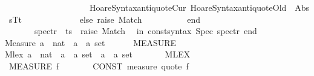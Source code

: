 \begin{isabellebody}
\ \ \ \ \ \ \ \ \ \ \ \ \ \ \ \ \ \ \ \ Hoare{\isacharunderscore}Syntax{\isachardot}antiquoteCur\ Hoare{\isacharunderscore}Syntax{\isachardot}antiquoteOld\ \ {\isacharparenleft}Abs\ {\isacharparenleft}s{\isacharcomma}T{\isacharcomma}t{\isacharparenright}{\isacharparenright}{\isacharparenright}\isanewline
\ \ \ \ \ \ \ \ \ \ \ \ \ else\ raise\ Match\isanewline
\ \ \ \ \ \ \ \ \ \ end\isanewline
\ \ \ \ \ \ {\isacharbar}\ spec{\isacharunderscore}tr{\isacharprime}\ {\isacharunderscore}\ ts\ {\isacharequal}\ raise\ Match\isanewline
\ \ in\ {\isacharbrackleft}{\isacharparenleft}{\isacharat}{\isacharbraceleft}const{\isacharunderscore}syntax\ Spec{\isacharbraceright}{\isacharcomma}\ spec{\isacharunderscore}tr{\isacharprime}{\isacharparenright}{\isacharbrackright}\ end\isanewline
{\isacartoucheclose}%
\endisatagML
{\isafoldML}%
%
\isadelimML
\isanewline
%
\endisadelimML
\isanewline
{}\isamarkupfalse%
\isanewline
{\isachardoublequoteopen}{\isacharunderscore}Measure{\isachardoublequoteclose}{\isacharcolon}{\isacharcolon}\ {\isachardoublequoteopen}{\isacharparenleft}{\isacharprime}a\ {\isasymRightarrow}\ nat{\isacharparenright}\ {\isasymRightarrow}\ {\isacharparenleft}{\isacharprime}a\ {\isasymtimes}\ {\isacharprime}a{\isacharparenright}\ set{\isachardoublequoteclose}\isanewline
\ \ \ \ \ \ {\isacharparenleft}{\isachardoublequoteopen}MEASURE\ {\isacharunderscore}{\isachardoublequoteclose}\ {\isacharbrackleft}{}{}{\isacharbrackright}\ {}{\isacharparenright}\isanewline
{\isachardoublequoteopen}{\isacharunderscore}Mlex{\isachardoublequoteclose}{\isacharcolon}{\isacharcolon}\ {\isachardoublequoteopen}{\isacharparenleft}{\isacharprime}a\ {\isasymRightarrow}\ nat{\isacharparenright}\ {\isasymRightarrow}\ {\isacharparenleft}{\isacharprime}a\ {\isasymtimes}\ {\isacharprime}a{\isacharparenright}\ set\ {\isasymRightarrow}\ {\isacharparenleft}{\isacharprime}a\ {\isasymtimes}\ {\isacharprime}a{\isacharparenright}\ set{\isachardoublequoteclose}\isanewline
\ \ \ \ \ \ {\isacharparenleft}\ {\isachardoublequoteopen}{\isacharless}{\isacharasterisk}MLEX{\isacharasterisk}{\isachargreater}{\isachardoublequoteclose}\ {}{}{\isacharparenright}\isanewline
\isanewline
\isanewline
{}\isamarkupfalse%
\isanewline
\ {\isachardoublequoteopen}MEASURE\ f{\isachardoublequoteclose}\ \ \ \ \ \ \ {\isacharequal}{\isachargreater}\ {\isachardoublequoteopen}{\isacharparenleft}CONST\ measure{\isacharparenright}\ {\isacharparenleft}{\isacharunderscore}quote\ f{\isacharparenright}{\isachardoublequoteclose}\isanewline

\end{isabellebody}
